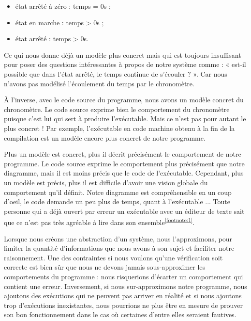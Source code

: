 \begin{itemize}
\item état arrêté à zéro : temps = 0s ;
\item état en marche : temps > 0s ;
\item état arrêté : temps > 0s.
\end{itemize}


Ce qui nous donne déjà un modèle plus concret mais qui est toujours insuffisant
pour poser des questions intéressantes à propos de notre système comme : « est-il
possible que dans l'état arrêté, le temps continue de s'écouler ? ». Car nous
n'avons pas modélisé l'écoulement du temps par le chronomètre.



À l'inverse, avec le code source du programme, nous avons un modèle concret du
chronomètre. Le code source exprime bien le comportement du chronomètre puisque
c'est lui qui sert à produire l'exécutable. Mais ce n'est pas pour autant le plus concret ! Par exemple, l'exécutable en code machine obtenu à la fin
de la compilation est un modèle encore plus concret de notre programme.



Plus un modèle est concret, plus il décrit précisément le comportement de notre
programme. Le code source exprime le comportement plus précisément que notre
diagramme, mais il est moins précis que le code de l'exécutable. Cependant, plus
un modèle est précis, plus il est difficile d'avoir une vision globale du
comportement qu'il définit. Notre diagramme est compréhensible en un coup d'oeil,
le code demande un peu plus de temps, quant à l'exécutable ... Toute personne qui
a déjà ouvert par erreur un exécutable avec un éditeur de texte sait que ce n'est
pas très agréable à lire dans son ensemble\textsuperscript{\ref{footnote:1}}.



Lorsque nous créons une abstraction d'un système, nous l'approximons, pour limiter
la quantité d'informations que nous avons à son sujet et faciliter notre
raisonnement. Une des contraintes si nous voulons qu'une vérification soit
correcte est bien sûr que nous ne devons jamais sous-approximer les comportements
du programme : nous risquerions d'écarter un comportement qui contient une erreur.
Inversement, si nous sur-approximons notre programme, nous ajoutons des exécutions
qui ne peuvent pas arriver en réalité et si nous ajoutons trop d'exécutions
inexistantes, nous pourrions ne plus être en mesure de prouver son bon
fonctionnement dans le cas où certaines d'entre elles seraient fautives.



